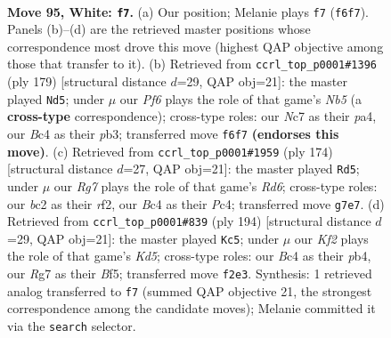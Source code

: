 \documentclass[11pt]{article}
\begin{document}
\clearpage

\begin{figure}[p]\centering
\begin{subfigure}{0.46\textwidth}\centering
\resizebox{\linewidth}{!}{%
\newchessgame
\chessboard[
  setfen={8/2N3R1/5P2/8/npB3Pk/8/2b2K2/8 w - - 3 95},
  showmover=false,
  pgfstyle=straightmove, color=movearrow, markmove={f6-f7}
]}
\caption{}
\end{subfigure}\hfill
\begin{subfigure}{0.46\textwidth}\centering
\resizebox{\linewidth}{!}{%
\newchessgame
\chessboard[
  setfen={5r2/8/8/p7/Pn3pK1/1P3N2/7R/5k2 b - - 39 90},
  showmover=false,
  pgfstyle=straightmove, color=movearrow, markmove={b4-d5}
]}
\caption{}
\end{subfigure}
\\[4pt]
\begin{subfigure}{0.46\textwidth}\centering
\resizebox{\linewidth}{!}{%
\newchessgame
\chessboard[
  setfen={8/k7/P2R4/2p2p2/2P5/1P6/5r2/1K6 w - - 1 88},
  showmover=false,
  pgfstyle=straightmove, color=movearrow, markmove={d6-d5}
]}
\caption{}
\end{subfigure}\hfill
\begin{subfigure}{0.46\textwidth}\centering
\resizebox{\linewidth}{!}{%
\newchessgame
\chessboard[
  setfen={1b5k/7P/5p2/3K1B2/1p6/8/P7/8 w - - 4 98},
  showmover=false,
  pgfstyle=straightmove, color=movearrow, markmove={d5-c5}
]}
\caption{}
\end{subfigure}
\caption{\textbf{Move 95, White: \texttt{f7}.} (a) Our position; Melanie plays \texttt{f7} (\texttt{f6f7}). Panels (b)--(d) are the retrieved master positions whose correspondence most drove this move (highest QAP objective among those that transfer to it). (b) Retrieved from \texttt{ccrl\_top\_p0001\#1396} (ply 179) [structural distance $d$=29, QAP obj=21]: the master played \texttt{Nd5}; under $\mu$ our \emph{Pf6} plays the role of that game's \emph{Nb5} (a \textbf{cross-type} correspondence); cross-type roles: our \emph{N}c7 as their \emph{p}a4, our \emph{B}c4 as their \emph{p}b3; transferred move \texttt{f6f7} \textbf{(endorses this move)}. (c) Retrieved from \texttt{ccrl\_top\_p0001\#1959} (ply 174) [structural distance $d$=27, QAP obj=21]: the master played \texttt{Rd5}; under $\mu$ our \emph{Rg7} plays the role of that game's \emph{Rd6}; cross-type roles: our \emph{b}c2 as their \emph{r}f2, our \emph{B}c4 as their \emph{P}c4; transferred move \texttt{g7e7}. (d) Retrieved from \texttt{ccrl\_top\_p0001\#839} (ply 194) [structural distance $d$=29, QAP obj=21]: the master played \texttt{Kc5}; under $\mu$ our \emph{Kf2} plays the role of that game's \emph{Kd5}; cross-type roles: our \emph{B}c4 as their \emph{p}b4, our \emph{R}g7 as their \emph{B}f5; transferred move \texttt{f2e3}. Synthesis: 1 retrieved analog transferred to \texttt{f7} (summed QAP objective 21, the strongest correspondence among the candidate moves); Melanie committed it via the \texttt{search} selector.}
\label{fig:thought-m188}
\end{figure}
\end{document}

